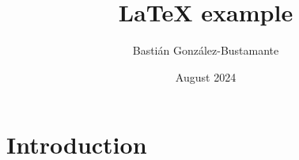 \documentclass{article}
\title{LaTeX example}
\author{Bastián González-Bustamante}
\date{August 2024}
\begin{document}
\maketitle

\section{Introduction}
\end{document}

